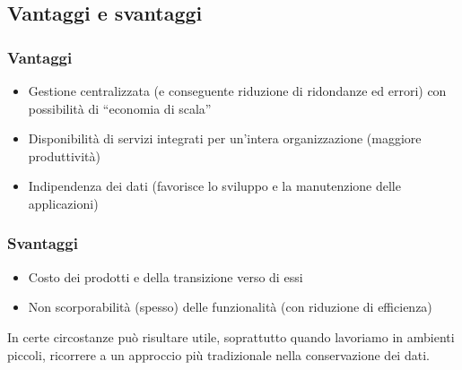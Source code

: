 \subsection{Vantaggi e svantaggi}
\subsubsection{Vantaggi}
\begin{itemize}
	\item Gestione centralizzata (e conseguente riduzione di ridondanze ed errori) con possibilità di “economia di scala”
	\item Disponibilità di servizi integrati per un'intera organizzazione (maggiore produttività)
	\item Indipendenza dei dati (favorisce lo sviluppo e la manutenzione delle applicazioni)
\end{itemize}
\subsubsection{Svantaggi} 
\begin{itemize}
	\item Costo dei prodotti e della transizione verso di essi
	\item Non scorporabilità (spesso) delle funzionalità (con riduzione di efficienza)
\end{itemize}
In certe circostanze può risultare utile, soprattutto quando lavoriamo in ambienti piccoli, ricorrere a un approccio più tradizionale nella conservazione dei dati.


